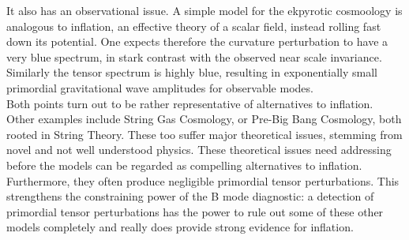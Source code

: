\documentclass[a4paper,10pt]{article}
\begin{document}
It also has an observational issue. A simple model for the ekpyrotic cosmoology is analogous to inflation, an effective theory of a scalar field, instead rolling fast down its potential. One expects therefore the curvature perturbation to have a very blue spectrum, in stark contrast with the observed near scale invariance. Similarly the tensor spectrum is highly blue, resulting in exponentially small primordial gravitational wave amplitudes for observable modes. \\

Both points turn out to be rather representative of alternatives to inflation. Other examples include String Gas Cosmology, or Pre-Big Bang Cosmology, both rooted in String Theory. These too suffer major theoretical issues, stemming from novel and not well understood physics. These theoretical issues need addressing before the models can be regarded as compelling alternatives to inflation. Furthermore, they often produce negligible primordial tensor perturbations. This strengthens the constraining power of the B mode diagnostic: a detection of primordial tensor perturbations has the power to rule out some of these other models completely and really does provide strong evidence for inflation.



\end{document}
